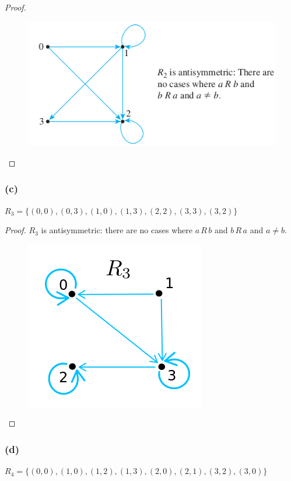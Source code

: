 \documentclass[14pt]{extarticle}
\begin{document}
\begin{proof}
        \begin{figure}[ht!]
                \centering
                \includegraphics[scale=0.5]{../images/8.5.1.b.png}
        \end{figure}
\end{proof}

\subsubsection{(c)}
\(R_3 = \{(0, 0), (0, 3), (1, 0), (1, 3), (2, 2), (3, 3),(3, 2)\}\)

\begin{proof}
        \(R_3\) is antisymmetric: there are no cases where \(a \,R\, b\) and \(b \,R\, a\) and \(a \neq b\).
        \begin{figure}[ht!]
                \centering
                \includegraphics[scale=0.5]{../images/8.5.1.c.png}
        \end{figure}
\end{proof}

\subsubsection{(d)}
\(R_4 = \{(0, 0), (1, 0), (1, 2), (1, 3), (2, 0), (2, 1),(3, 2), (3, 0)\}\)
\end{document}

